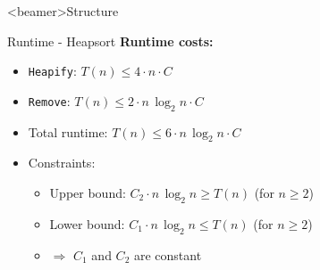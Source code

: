 \setcounter{subsubsection}{0}

\begin{frame}<beamer>{Structure}
\end{frame}

\begin{frame}{Runtime - Heapsort}
  \textbf{Runtime costs:}
  \begin{itemize}
    \item
      \texttt{Heapify}: $T(n) \leq 4 \cdot n \cdot C$
    \item
      \texttt{Remove}: $T(n) \leq 2 \cdot n \, \log_2 n \cdot C$
    \item
      Total runtime: $T(n) \leq 6 \cdot n \, \log_2 n \cdot C$
    \item
      Constraints:
      \begin{itemize}
        \item
          {\color{MainB}Upper bound}:
          $C_2 \cdot n \, \log_2 n \geq T(n)$ (for $n \geq 2$)
        \item
          {\color{MainB}Lower bound}:
          $C_1 \cdot n \, \log_2 n \leq T(n)$ (for $n \geq 2$)
        \item
          $\Rightarrow$ $C_1$ and $C_2$ are constant
      \end{itemize}
  \end{itemize}
\end{frame}